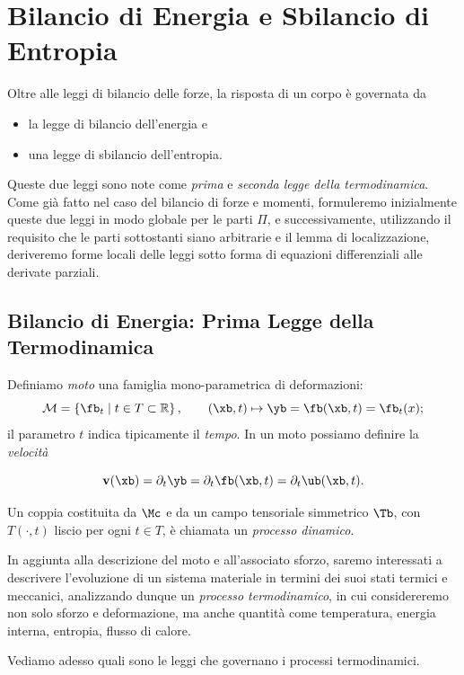 
	
\chapter{Bilancio di Energia e Sbilancio di Entropia}

Oltre alle leggi di bilancio delle forze, la risposta di un corpo è governata da  
\begin{itemize}
	\item[(i)] la legge di bilancio dell'energia e  
	\item[(ii)] una legge di sbilancio dell'entropia.
\end{itemize}

Queste due leggi sono note come  \textit{prima} e  \textit{seconda legge della termodinamica}. Come già fatto nel caso del bilancio di forze e momenti, formuleremo inizialmente queste due leggi in modo globale per le parti \( \Pi \), e successivamente, utilizzando il requisito che le parti sottostanti siano arbitrarie e il lemma di localizzazione, deriveremo forme locali delle leggi sotto forma di equazioni differenziali alle derivate parziali.


\section{Bilancio di Energia: Prima Legge della Termodinamica}
Definiamo  \textit{moto}  una famiglia mono-parametrica di deformazioni:
	\[
	\mathcal{M} = \left\{ \fb_t \mid t \in T \subset \mathbb{R} \right\}, \qquad 	(\xb, t) \mapsto \yb = \fb(\xb, t) = \fb_t(x);
	\]
il parametro $t$ indica tipicamente il \textit{tempo}. In un moto possiamo definire la \textit{velocità}

	\[
	\mathbf{v}(\xb) = \partial_t \yb = \partial_t \fb(\xb, t)= \partial_t \ub(\xb, t).
	\]

Un coppia costituita da \( \Mc \) e da un campo tensoriale simmetrico \( \Tb \), con \( T(\cdot, t) \) liscio per ogni \( t \in T \), è chiamata un \textit{processo dinamico}.

In aggiunta alla descrizione del moto e all'associato sforzo, saremo interessati a descrivere l'evoluzione di un sistema materiale in termini dei suoi stati termici e meccanici, analizzando dunque un \textit{processo termodinamico}, in cui considereremo non solo sforzo e deformazione, ma anche quantità come temperatura, energia interna, entropia, flusso di calore.

Vediamo adesso quali sono le leggi che governano i processi termodinamici.


